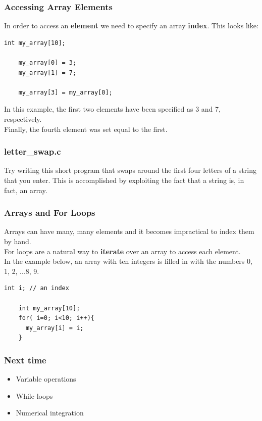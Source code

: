 \documentclass{beamer}
\begin{document}
\begin{frame}
  \frametitle{Accessing Array Elements}
  In order to access an \textbf{element} we need to specify an array \textbf{index}.
  This looks like:
  \begin{lstlisting}[style=customc]
    int my_array[10];
   
    my_array[0] = 3;
    my_array[1] = 7;

    my_array[3] = my_array[0];
  \end{lstlisting}
  In this example, the first two elements have been specified as 3 and 7, respectively.\\
  Finally, the fourth element was set equal to the first.
\end{frame}

\begin{frame}
  \frametitle{letter\_swap.c}
  Try writing this short program that swaps around the first four letters of a string that you enter.
  This is accomplished by exploiting the fact that a string is, in fact, an array.
  
\end{frame}

\begin{frame}[fragile]
  \frametitle{Arrays and For Loops}
  Arrays can have many, many elements and it becomes impractical to index them by hand.\\
  For loops are a natural way to \textbf{iterate} over an array to access each element.\\
  In the example below, an array with ten integers is filled in with the numbers 0, 1, 2, ...8, 9.
  \begin{lstlisting}[style=customc]
    int i; // an index

    int my_array[10];
    for( i=0; i<10; i++){
      my_array[i] = i;
    }
  \end{lstlisting}
\end{frame}

\begin{frame}
  \frametitle{Next time}
  \begin{itemize}
    \item Variable operations
    \item While loops
    \item Numerical integration
  \end{itemize}
\end{frame}
\end{document}

